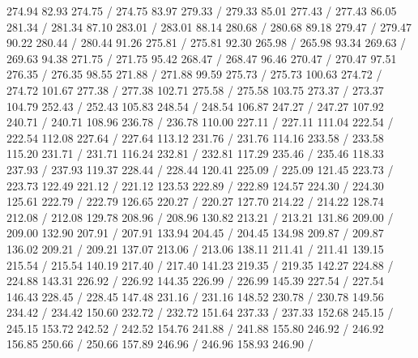 { 274.94 82.93 274.75 /
 274.75 83.97 279.33 /
 279.33 85.01 277.43 /
 277.43 86.05 281.34 /
 281.34 87.10 283.01 /
 283.01 88.14 280.68 /
 280.68 89.18 279.47 /
 279.47 90.22 280.44 /
 280.44 91.26 275.81 /
 275.81 92.30 265.98 /
 265.98 93.34 269.63 /
 269.63 94.38 271.75 /
 271.75 95.42 268.47 /
 268.47 96.46 270.47 /
 270.47 97.51 276.35 /
 276.35 98.55 271.88 /
 271.88 99.59 275.73 /
 275.73 100.63 274.72 /
 274.72 101.67 277.38 /
 277.38 102.71 275.58 /
 275.58 103.75 273.37 /
 273.37 104.79 252.43 /
 252.43 105.83 248.54 /
 248.54 106.87 247.27 /
 247.27 107.92 240.71 /
 240.71 108.96 236.78 /
 236.78 110.00 227.11 /
 227.11 111.04 222.54 /
 222.54 112.08 227.64 /
 227.64 113.12 231.76 /
 231.76 114.16 233.58 /
 233.58 115.20 231.71 /
 231.71 116.24 232.81 /
 232.81 117.29 235.46 /
 235.46 118.33 237.93 /
 237.93 119.37 228.44 /
 228.44 120.41 225.09 /
 225.09 121.45 223.73 /
 223.73 122.49 221.12 /
 221.12 123.53 222.89 /
 222.89 124.57 224.30 /
 224.30 125.61 222.79 /
 222.79 126.65 220.27 /
 220.27 127.70 214.22 /
 214.22 128.74 212.08 /
 212.08 129.78 208.96 /
 208.96 130.82 213.21 /
 213.21 131.86 209.00 /
 209.00 132.90 207.91 /
 207.91 133.94 204.45 /
 204.45 134.98 209.87 /
 209.87 136.02 209.21 /
 209.21 137.07 213.06 /
 213.06 138.11 211.41 /
 211.41 139.15 215.54 /
 215.54 140.19 217.40 /
 217.40 141.23 219.35 /
 219.35 142.27 224.88 /
 224.88 143.31 226.92 /
 226.92 144.35 226.99 /
 226.99 145.39 227.54 /
 227.54 146.43 228.45 /
 228.45 147.48 231.16 /
 231.16 148.52 230.78 /
 230.78 149.56 234.42 /
 234.42 150.60 232.72 /
 232.72 151.64 237.33 /
 237.33 152.68 245.15 /
 245.15 153.72 242.52 /
 242.52 154.76 241.88 /
 241.88 155.80 246.92 /
 246.92 156.85 250.66 /
 250.66 157.89 246.96 /
 246.96 158.93 246.90 /
}
